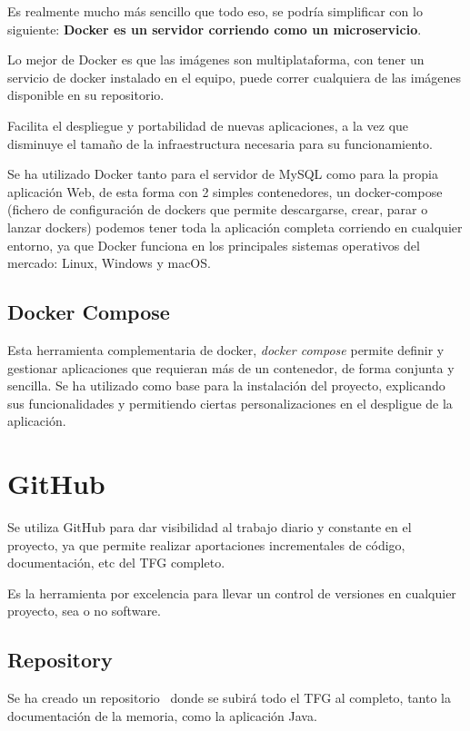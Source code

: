 Es realmente mucho más sencillo que todo eso, se podría simplificar con lo siguiente: \textbf{Docker es un servidor corriendo como un microservicio}.

Lo mejor de Docker es que las imágenes son multiplataforma, con tener un servicio de docker instalado en el equipo, puede correr cualquiera de las imágenes disponible en su repositorio.

Facilita el despliegue y portabilidad de nuevas aplicaciones, a la vez que disminuye el tamaño de la infraestructura necesaria para su funcionamiento.

Se ha utilizado Docker tanto para el servidor de MySQL como para la propia aplicación Web, de esta forma con 2 simples contenedores, un docker-compose (fichero de configuración de dockers que permite descargarse, crear, parar o lanzar dockers) podemos tener toda la aplicación completa corriendo en cualquier entorno, ya que Docker funciona en los principales sistemas operativos del mercado: Linux, Windows y macOS.

\subsection{Docker Compose}

Esta herramienta complementaria de docker, \textit{docker compose} \cite{web:dockercompose} permite definir y gestionar aplicaciones que requieran más de un contenedor, de forma conjunta y sencilla.
Se ha utilizado como base para la instalación del proyecto, explicando sus funcionalidades y permitiendo ciertas personalizaciones en el despligue de la aplicación.

\section{GitHub}

Se utiliza GitHub para dar visibilidad al trabajo diario y constante en el proyecto, ya que permite realizar aportaciones incrementales de código, documentación, etc del TFG completo.

Es la herramienta por excelencia para llevar un control de versiones en cualquier proyecto, sea o no software.

\subsection{Repository}

Se ha creado un repositorio~\cite{github:repo} donde se subirá todo el TFG al completo, tanto la documentación de la memoria, como la aplicación Java.

